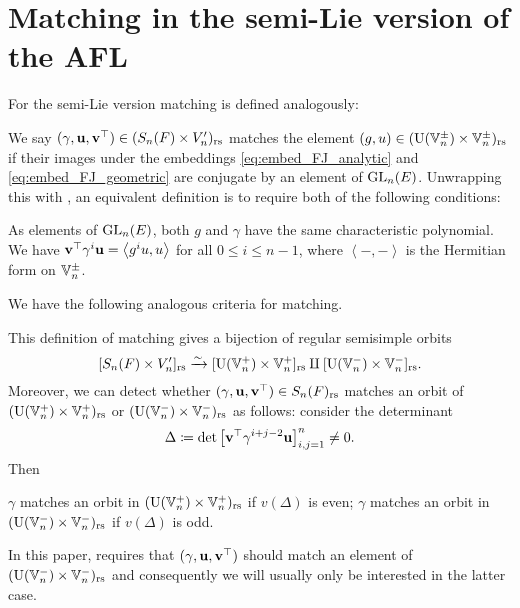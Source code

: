 \section{Matching in the semi-Lie version of the AFL}
For the semi-Lie version matching is defined analogously:
\begin{definition}
  We say $(\gamma, \mathbf u, \mathbf v^\top) \in (S_n(F) \times V_n')_{\mathrm{rs}}$
  matches the element $(g, u) \in (\operatorname{U}(\mathbb V_n^\pm) \times \mathbb V_n^\pm)_{\mathrm{rs}}$ if
  their images under the embeddings \eqref{eq:embed_FJ_analytic}
  and \eqref{eq:embed_FJ_geometric} are conjugate by an element of $\operatorname{GL}_n(E)$.
  Unwrapping this with ,
  an equivalent definition is to require both of the following conditions:
  \begin{itemize}
    \ii As elements of $\operatorname{GL}_n(E)$,
    both $g$ and $\gamma$ have the same characteristic polynomial.
    \ii We have $\mathbf v^\top \gamma^i \mathbf u = \left< g^i u, u \right>$ for all $0 \le i \le n-1$,
    where $\left< -,- \right>$ is the Hermitian form on $\mathbb V_n^\pm$.
  \end{itemize}
  \label{def:matching_semi_lie}
\end{definition}
We have the following analogous criteria for matching.
\begin{proposition}
  \label{prop:valuation_delta_matching_semilie}
  This definition of matching gives a bijection of regular semisimple orbits
  \[ [S_n(F) \times V_n']_{\mathrm{rs}} \xrightarrow{\sim} [\operatorname{U}(\mathbb V_n^+) \times \mathbb V_n^+]_{\mathrm{rs}} \amalg [\operatorname{U}(\mathbb V_n^-) \times \mathbb V_n^-]_{\mathrm{rs}}. \]
  Moreover, we can detect whether ${(\gamma, \mathbf u, \mathbf v^\top)} \in S_n(F)_{\mathrm{rs}}$ matches an orbit of
  $(\operatorname{U}(\mathbb V_n^+) \times \mathbb V_n^+)_{\mathrm{rs}}$ or $(\operatorname{U}(\mathbb V_n^-) \times \mathbb V_n^-)_{\mathrm{rs}}$ as follows:
  consider the determinant
  \[ \Delta \coloneqq \det \left[ \mathbf v^\top \gamma^{i+j-2} \mathbf u \right]_{i,j=1}^n \neq 0. \]
  Then
  \begin{itemize}
    \ii $\gamma$ matches an orbit in $(\operatorname{U}(\mathbb V_n^+) \times \mathbb V_n^+)_{\mathrm{rs}}$ if $v(\Delta)$ is even;
    \ii $\gamma$ matches an orbit in $(\operatorname{U}(\mathbb V_n^-) \times \mathbb V_n^-)_{\mathrm{rs}}$ if $v(\Delta)$ is odd.
  \end{itemize}
\end{proposition}
In this paper, 
requires that ${(\gamma, \mathbf u, \mathbf v^\top)}$ should match an element of $(\operatorname{U}(\mathbb V_n^-) \times \mathbb V_n^-)_{\mathrm{rs}}$
and consequently we will usually only be interested in the latter case.
